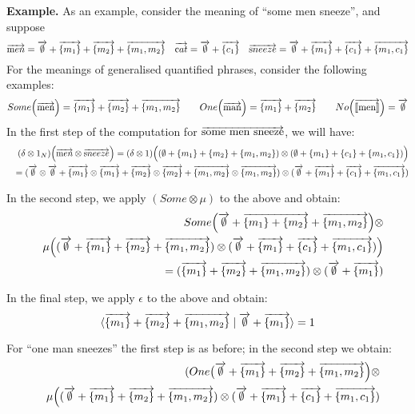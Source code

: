 \bigskip
\noindent
{\bf Example.}
As an example,  consider  the  meaning  of  ``some men sneeze'', and suppose
\[
\overrightarrow{\text men} = \overrightarrow{\emptyset} + \overrightarrow{\{m_1\}} + \overrightarrow{\{m_2\}} + \overrightarrow{\{m_1, m_2\}} \quad
\overrightarrow{\text cat} = \overrightarrow{\emptyset} + \overrightarrow{\{c_1\}} \quad 
\overrightarrow{\text sneeze} = \overrightarrow{\emptyset} + \overrightarrow{\{m_1\}} + \overrightarrow{\{c_1\}} + \overrightarrow{\{m_1, c_1\}} 
\]
For the meanings of generalised quantified phrases, consider the following examples:
\[
Some\Big(\overrightarrow{{\text{men}}}\Big) =  \overrightarrow{\{m_1\}}+ \overrightarrow{\{m_2\}}+ \overrightarrow{\{m_1, m_2\}} \qquad
One\Big(\overrightarrow{{\text{man}}}\Big) = \overrightarrow{\{m_1\}} + \overrightarrow{\{m_2\}} \qquad 
No\Big(\overrightarrow{[\![ \text{men} ]\!]}\Big) = \overrightarrow{\emptyset}
\]
In the first step of the computation for $\overrightarrow{\mbox {some men sneeze}}$, we will have:
\begin{eqnarray*}
&&(\delta \otimes 1_N) \Big(\overrightarrow{\text men} \otimes \overrightarrow{\text sneeze}\Big) = (\delta \otimes 1) \Big((\emptyset + \{m_1\} + \{m_2\} + \{m_1, m_2\}) \otimes (\emptyset + \{m_1\} + \{c_1\} + \{m_1, c_1\}) \Big)\\
&&=  (\overrightarrow{\emptyset} \otimes \overrightarrow{\emptyset }+ \overrightarrow{\{m_1\}} \otimes \overrightarrow{\{m_1\}} + \overrightarrow{\{m_2\}} \otimes \overrightarrow{\{m_2\}} + \overrightarrow{\{m_1, m_2\}} \otimes \overrightarrow{\{m_1, m_2\}}) \otimes (\overrightarrow{\emptyset} + \overrightarrow{\{m_1\}} + \overrightarrow{\{c_1\}} + \overrightarrow{\{m_1, c_1\}})
\end{eqnarray*}

\noindent
In the second step, we apply $(Some \otimes \mu)$ to the above and obtain:
\begin{eqnarray*}
&& Some\Big(\overrightarrow{\emptyset} + \overrightarrow{\{m_1\} + \{m_2\}} + \overrightarrow{\{m_1, m_2\}}\Big) \otimes\\
&& \mu \Big((\overrightarrow{\emptyset}  + \overrightarrow{\{m_1\}}  + \overrightarrow{\{m_2\}}  + \overrightarrow{\{m_1, m_2\}}) \otimes (\overrightarrow{\emptyset} + \overrightarrow{\{m_1\}} + \overrightarrow{\{c_1\}} + \overrightarrow{\{m_1, c_1\}})\Big) \\
&&= (\overrightarrow{\{m_1\}} + \overrightarrow{\{m_2\}} + \overrightarrow{\{m_1, m_2\}}) \otimes (\overrightarrow{\emptyset} + \overrightarrow{\{m_1\}})
\end{eqnarray*}

\noindent
In the final step, we apply $\epsilon$ to the above and obtain:
\[
\langle \overrightarrow{\{m_1\}} + \overrightarrow{\{m_2\}} + \overrightarrow{\{m_1, m_2\}} \mid \overrightarrow{\emptyset} + \overrightarrow{\{m_1\}} \rangle =  1
\]

\noindent
For ``one man sneezes'' the first step is as before; in the second step we obtain:
\begin{eqnarray*}
&& (One\big(\overrightarrow{\emptyset} + \overrightarrow{\{m_1\}} + \overrightarrow{\{m_2\}} + \overrightarrow{\{m_1, m_2\}}\Big) \otimes\\
&&  \mu \Big((\overrightarrow{\emptyset}  + \overrightarrow{\{m_1\}}  + \overrightarrow{\{m_2\}}  + \overrightarrow{\{m_1, m_2\}}) \otimes (\overrightarrow{\emptyset} + \overrightarrow{\{m_1\}} + \overrightarrow{\{c_1\}} + \overrightarrow{\{m_1, c_1\}})
\end{eqnarray*}

